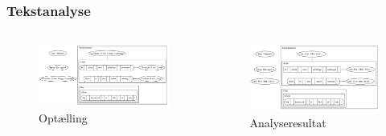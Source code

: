 \documentclass{beamer}
\begin{document}
\begin{frame}
  \frametitle{Tekstanalyse}

  \begin{columns}[t]
    \begin{figure}
      \includegraphics[width=\textwidth]{documentCount.pdf}
      \caption{Optælling}
    \end{figure}

    \begin{figure}
      \includegraphics[width=\textwidth]{documentAnalyse.pdf}
      \caption{Analyseresultat}
    \end{figure}
  \end{columns}
\end{frame}

\end{document}
